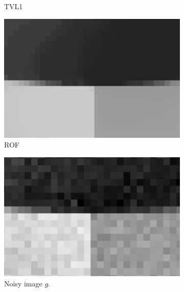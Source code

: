 \documentclass[abstracton]{scrreprt}
\begin{document}
\begin{figure}[!ht]
\begin{subfigure}[b]{0.29\textwidth}
                    \caption{TVL1}
                \end{subfigure}
                \begin{subfigure}[b]{0.29\textwidth}
                    \includegraphics[width=\textwidth]{img/zoomed/gauss_noise_rof_zoomed.png}
                    \caption{ROF}
                \end{subfigure}
                \begin{subfigure}[b]{0.29\textwidth}
                    \includegraphics[width=\textwidth]{img/zoomed/gauss_noise_original_zoomed.png}
                    \caption{Noisy image $g$.}
                \end{subfigure}
                \begin{subfigure}[b]{0.29\textwidth}

\end{subfigure}
\end{figure}
\end{document}
